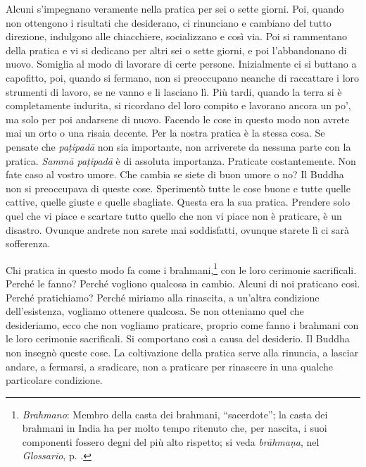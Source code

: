 Alcuni s'impegnano veramente nella pratica per sei o sette giorni. Poi,
quando non ottengono i risultati che desiderano, ci rinunciano e
cambiano del tutto direzione, indulgono alle chiacchiere, socializzano e
così via. Poi si rammentano della pratica e vi si dedicano per altri sei
o sette giorni, e poi l'abbandonano di nuovo. Somiglia al modo di
lavorare di certe persone. Inizialmente ci si buttano a capofitto, poi,
quando si fermano, non si preoccupano neanche di raccattare i loro
strumenti di lavoro, se ne vanno e li lasciano lì. Più tardi, quando la
terra si è completamente indurita, si ricordano del loro compito e
lavorano ancora un po', ma solo per poi andarsene di nuovo. Facendo le
cose in questo modo non avrete mai un orto o una risaia decente. Per la
nostra pratica è la stessa cosa. Se pensate che \emph{paṭipadā} non sia
importante, non arriverete da nessuna parte con la pratica. \emph{Sammā
paṭipadā} è di assoluta importanza. Praticate costantemente. Non fate
caso al vostro umore. Che cambia se siete di buon umore o no? Il Buddha
non si preoccupava di queste cose. Sperimentò tutte le cose buone e
tutte quelle cattive, quelle giuste e quelle sbagliate. Questa era la
sua pratica. Prendere solo quel che vi piace e scartare tutto quello che
non vi piace non è praticare, è un disastro. Ovunque andrete non sarete
mai soddisfatti, ovunque starete lì ci sarà sofferenza.

Chi pratica in questo modo fa come i brahmani,\footnote{\emph{Brahmano}: Membro
  della casta dei brahmani, ``sacerdote''; la casta dei brahmani in
  India ha per molto tempo ritenuto che, per nascita, i suoi componenti
  fossero degni del più alto rispetto; si veda \emph{brāhmaṇa}, nel
  \emph{Glossario}, p. \pageref{glossary-brahmana}.} con le loro cerimonie sacrificali. Perché le fanno?
Perché vogliono qualcosa in cambio. Alcuni di noi praticano così. Perché
pratichiamo? Perché miriamo alla rinascita, a un'altra condizione
dell'esistenza, vogliamo ottenere qualcosa. Se non otteniamo quel che
desideriamo, ecco che non vogliamo praticare, proprio come fanno i
brahmani con le loro cerimonie sacrificali. Si comportano così a causa
del desiderio. Il Buddha non insegnò queste cose. La coltivazione della
pratica serve alla rinuncia, a lasciar andare, a fermarsi, a sradicare,
non a praticare per rinascere in una qualche particolare condizione.

